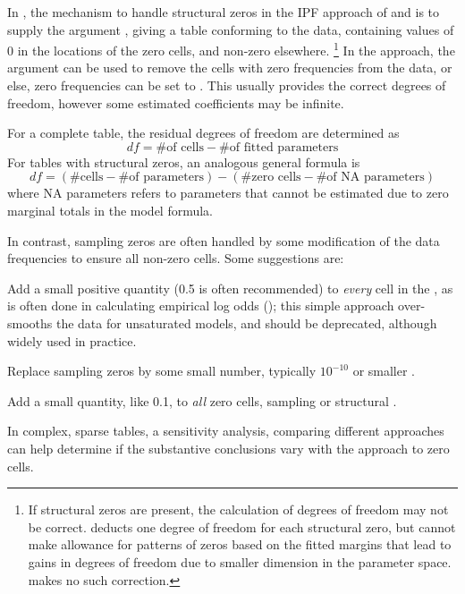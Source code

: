 \documentclass[11pt]{book}\usepackage[]{graphicx}\usepackage[]{color}
\begin{document}
In \R, the mechanism to handle structural zeros in the IPF approach of
 and  is to supply the argument ,
giving a table conforming to the data, containing values of 0 in
the locations of the zero cells, and non-zero elsewhere.%
\footnote{
If structural zeros are present, the calculation of degrees of freedom may not be correct.  deducts one degree of freedom for each structural zero, but cannot make allowance for
patterns of zeros based on the fitted margins that lead to
gains in degrees of freedom due to smaller dimension in the parameter space.
 makes no such correction.
}
In the  approach, the argument  can be
used to remove the cells with zero frequencies from the data,
or else, zero frequencies can be set to .
This usually  provides the correct degrees of freedom, however some estimated
coefficients may be infinite.

For a complete table, the residual degrees of freedom are determined as
\begin{equation*}
df = \mbox{\# of cells} - \mbox{\# of fitted parameters}
\end{equation*}
For tables with structural zeros, an analogous general formula is
\begin{equation}\label{eq:dfzeros}
df = (\mbox{\# cells} - \mbox{\# of parameters})
   - (\mbox{\# zero cells} - \mbox{\# of NA parameters})
\end{equation}
where NA parameters refers to parameters that cannot be estimated
due to zero marginal totals in the model formula.


In contrast, sampling zeros are often handled by some modification of the
data frequencies to ensure all non-zero cells.
Some suggestions are:
\begin{itemize*}
\item Add a small positive quantity (0.5 is often recommended) to \emph{every}
cell in the \ctab \citep{Goodman:70}, as is often done in calculating
empirical log odds (); this simple approach over-smooths the
data for unsaturated models, and should be deprecated, although widely
used in practice.

\item Replace sampling zeros by some small number, typically
$10^{-10}$ or smaller \citep{Agresti:90}.
\item Add a small quantity, like 0.1, to \emph{all} zero cells, sampling or structural
\citep{EversNamboodiri:77}.
\end{itemize*}
In complex, sparse tables, a sensitivity analysis, comparing different approaches can help determine if the substantive conclusions vary with the approach to zero cells.
\end{document}

